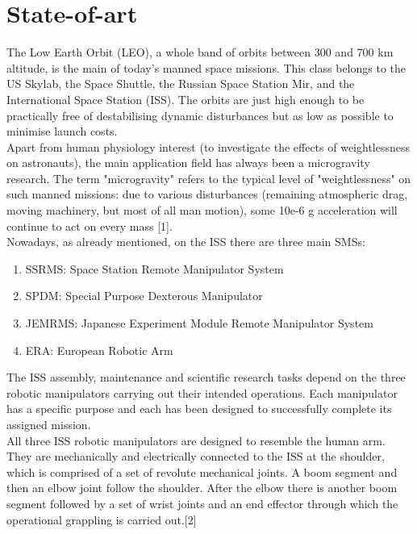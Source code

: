 \documentclass[a4paper,12pt,oneside]{report}
\begin{document}
\section{State-of-art}\label{state_of_art}
The Low Earth Orbit (LEO), a whole band of orbits between 300 and 700 km altitude, is the main of today's manned space missions. This class belongs to the US Skylab, the Space Shuttle, the Russian Space Station Mir, and the International Space Station (ISS). The orbits are just high enough to be practically free of destabilising dynamic disturbances but as low as possible to minimise launch costs.\\
Apart from human physiology interest (to investigate the effects of weightlessness on astronauts), the main application field has always been a microgravity research. The term "microgravity" refers to the typical level of "weightlessness" on such manned missions: due to various disturbances (remaining atmospheric drag, moving machinery, but most of all man motion), some 10e-6 g acceleration will continue to act on every mass [1].\\
Nowadays, as already mentioned, on the ISS there are three main SMSs:
\begin{enumerate}
  \item SSRMS: Space Station Remote Manipulator System
  \item SPDM: Special Purpose Dexterous Manipulator
  \item JEMRMS: Japanese Experiment Module Remote Manipulator System
  \item ERA: European Robotic Arm
\end{enumerate}
The ISS assembly, maintenance and scientific research tasks depend on the three robotic manipulators carrying out their intended operations. Each manipulator has a specific purpose and each has been designed to successfully complete its assigned mission.\\
All three ISS robotic manipulators are designed to resemble the human arm. They are mechanically and electrically connected to the ISS at the shoulder, which is comprised of a set of revolute mechanical joints. A boom segment and then an elbow joint follow the shoulder. After the elbow there is another boom segment followed by a set of wrist joints and an end effector through which the operational grappling is carried out.[2]
\newpage
\end{document}
